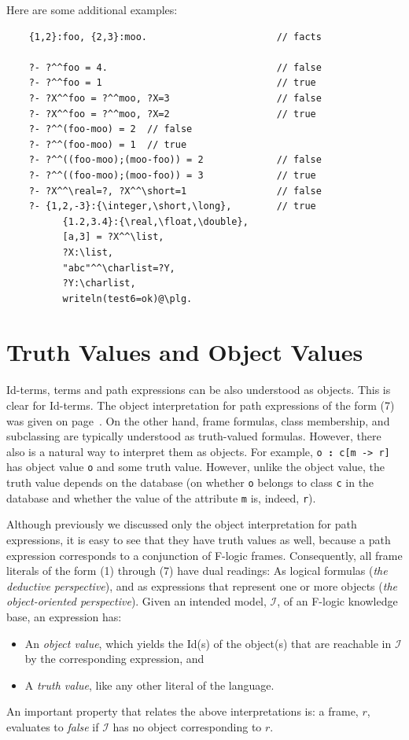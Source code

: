 \documentclass[11pt]{article}
\newcommand{\db}[1]{\ensuremath{\mathcal{#1}}}
\newcommand{\isa}{\,{\bf{:}}\,}
\newcommand{\mvd}{{\mbox{\tt \,->\,}}}  %
\newcommand{\fl}{\mbox{F-logic}\xspace}
\begin{document}
Here are some additional examples:
\begin{verbatim}
    {1,2}:foo, {2,3}:moo.                       // facts

    ?- ?^^foo = 4.                              // false
    ?- ?^^foo = 1                               // true
    ?- ?X^^foo = ?^^moo, ?X=3                   // false
    ?- ?X^^foo = ?^^moo, ?X=2                   // true
    ?- ?^^(foo-moo) = 2  // false
    ?- ?^^(foo-moo) = 1  // true
    ?- ?^^((foo-moo);(moo-foo)) = 2             // false
    ?- ?^^((foo-moo);(moo-foo)) = 3             // true
    ?- ?X^^\real=?, ?X^^\short=1                // false
    ?- {1,2,-3}:{\integer,\short,\long},        // true
          {1.2,3.4}:{\real,\float,\double},
          [a,3] = ?X^^\list,
          ?X:\list,
          "abc"^^\charlist=?Y,
          ?Y:\charlist,
          writeln(test6=ok)@\plg.
\end{verbatim}


\section{Truth Values and Object Values} \label{sec-references}


Id-terms, terms and path expressions can be also understood as
objects. This is clear for Id-terms. The object interpretation for path
expressions of the form (7) was given on page~\pageref{eq-path-fun}.
On the other hand, frame formulas, class membership, and subclassing
are typically understood as truth-valued formulas.
However, there
also is a natural way to interpret them as objects.  For example,
{\tt o{\isa}c[m{\mvd}r]} has object value {\tt o} and some truth value.
However, unlike the object value, the truth value depends on the database
(on whether {\tt o} belongs to class {\tt c} in the database and whether
the value of the attribute {\tt m} is, indeed, {\tt r}).

Although previously we discussed only the object interpretation for path
expressions, it is easy to see that they have truth values as well, because
a path expression corresponds to a conjunction of F-logic frames.
Consequently, all frame literals of the form (1) through (7) have dual
readings: As logical formulas (\emph{the deductive perspective}), and as
expressions that represent one or more objects (\emph{the object-oriented
  perspective}).  Given an intended model, \db I, of an \fl knowledge base, an
expression has:
\begin{itemize}
\item An \emph{object value}, which yields the Id(s) of the object(s)
  that are reachable in \db I by the corresponding expression, and 
\item A \emph{truth value}, like any other literal of the
  language. 
\end{itemize}
An important property that relates the above interpretations is: a
frame, $r$, evaluates to \emph{false} if \db I has no object
corresponding to $r$.
\end{document}
